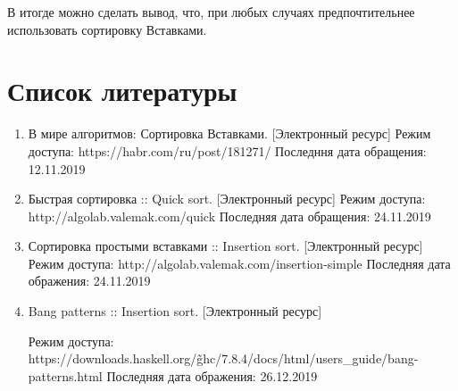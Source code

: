 \documentclass[12pt]{report}
\begin{document}
В итогде можно сделать вывод, что, при любых случаях предпочтительнее использовать сортировку Вставками.

\chapter*{Список литературы}
\begin{enumerate} 
	\item В мире алгоритмов: Сортировка Вставками. [Электронный ресурс] Режим доступа: https://habr.com/ru/post/181271/ Последння дата обращения: 12.11.2019
	\item Быстрая сортировка :: Quick sort. [Электронный ресурс] Режим доступа:
	http://algolab.valemak.com/quick Последняя дата обращения: 24.11.2019
	\item Сортировка простыми вставками :: Insertion sort. [Электронный ресурс] Режим доступа: http://algolab.valemak.com/insertion-simple Последняя дата ображения: 24.11.2019
	\item Bang patterns :: Insertion sort. [Электронный ресурс] 
	
	Режим доступа: https://downloads.haskell.org/\~ghc/7.8.4/docs/html/users\_guide/bang-patterns.html Последняя дата ображения: 26.12.2019
\end{enumerate} 
\end{document}
